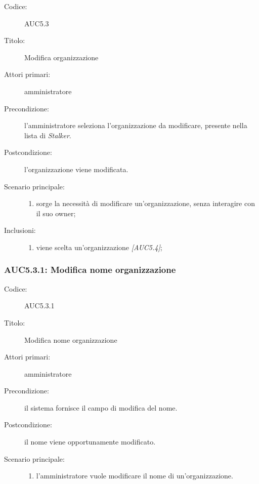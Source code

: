 \documentclass[../../../analisi-dei-requisiti.tex]{subfiles}
\begin{document}
\begin{description}
  \item[Codice:] AUC5.3
  \item[Titolo:] Modifica organizzazione
  \item[Attori primari:] amministratore
  \item[Precondizione:] l'amministratore seleziona l'organizzazione da modificare, presente nella lista di \emph{Stalker}.
  \item[Postcondizione:] l'organizzazione viene modificata.
  \item[Scenario principale:]
  \begin{enumerate}
    \item sorge la necessità di modificare un'organizzazione, senza interagire con il suo owner;
  \end{enumerate}
  \item[Inclusioni:]
  \begin{enumerate}
    \item viene scelta un'organizzazione \emph{[AUC5.4]};
  \end{enumerate}
\end{description}

\subsubsection{AUC5.3.1: Modifica nome organizzazione}%
\label{subs:AUC5.3.1}
\begin{description}
  \item[Codice:] AUC5.3.1
  \item[Titolo:] Modifica nome organizzazione
  \item[Attori primari:] amministratore
  \item[Precondizione:] il sistema fornisce il campo di modifica del nome.
  \item[Postcondizione:] il nome viene opportunamente modificato.
  \item[Scenario principale:]
  \begin{enumerate}
    \item l'amministratore vuole modificare il nome di un'organizzazione.
  \end{enumerate}
\end{description}
\end{document}
